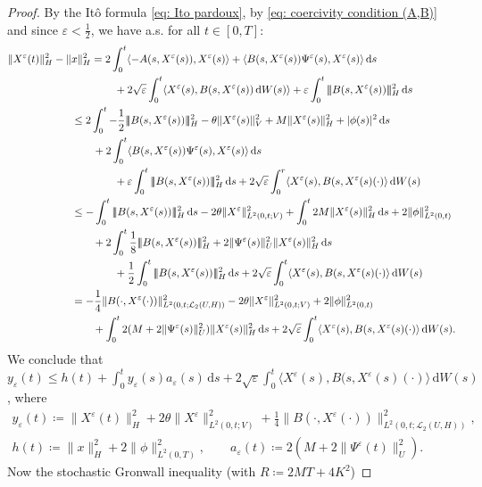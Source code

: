 \documentclass{amsart}
\newcommand{\dd}{\,\mathrm{d}}
\newcommand{\UH}{\mathcal{L}_2(U,H)}
\newcommand{\<}{\langle}
\newcommand{\?}{\rangle}
\newcommand{\nn}{|\!|\!|}
\theoremstyle{plain}
\theoremstyle{remark}
\theoremstyle{plain}
\numberwithin{equation}{section}
\newcommand{\eps}{\varepsilon}
\begin{document}
\begin{proof}
By the It\^o formula \eqref{eq: Ito pardoux},
 by \eqref{eq: coercivity condition (A,B)} and since $\eps<\frac{1}{2}$, we have a.s. \!for all $t\in[0,T]$:
  \begin{align}
    \|X^\eps(t)\|_H^2-\|&x\|_H^2=2\int_0^t\<-A(s,X^\eps(s)),X^\eps(s)\?+\<B(s,X^\eps(s))\Psi^\eps(s),X^\eps(s)\?\dd s\notag\\
    &\qquad\qquad+2\sqrt{\eps}\int_0^t \<X^\eps(s),B(s,X^\eps(s))\dd W(s)\?+\eps\int_0^t \nn B(s,X^\eps(s))\nn_H^2\dd s\notag\\
    &\leq 2\int_0^t-\frac{1}{2}\nn B(s,X^\eps(s))\nn_H^2-\theta\|X^\eps(s)\|_V^2+M\|X^\eps(s)\|_H^2+|\phi(s)|^2\dd s \notag\\
    &\qquad +2\int_0^t\<B(s,X^\eps(s))\Psi^\eps(s),X^\eps(s)\?\dd s\notag\\
    &\qquad\qquad +\eps\int_0^t \nn B(s,X^\eps(s))\nn_H^2\dd s+2\sqrt{\eps}\int_0^r \<X^\eps(s),B(s,X^\eps(s)(\cdot)\?\dd W(s)\notag\\
    &\leq -\int_0^t \nn B(s,X^\eps(s))\nn_H^2\dd s-2\theta\|X^\eps\|_{L^2(0,t;V)}^2+\int_0^t 2M\|X^\eps(s)\|_H^2\dd s+2\|\phi\|_{L^2(0,t)}^2\notag\\
    &\qquad+2\int_0^t \frac{1}{8}\nn B(s,X^\eps(s))\nn_H^2+2\|\Psi^\eps(s)\|_U^2\|X^\eps(s)\|_H^2\dd s\notag\\
    &\qquad\qquad+\frac{1}{2}\int_0^t \nn B(s,X^\eps(s))\nn_H^2\dd s+2\sqrt{\eps}\int_0^t \<X^\eps(s),B(s,X^\eps(s)(\cdot)\?\dd W(s)\notag\\
    &= -\frac{1}{4}\|B(\cdot,X^\eps(\cdot))\|_{L^2(0,t;\UH)}^2
    -2\theta\|X^\eps\|_{L^2(0,t;V)}^2+2\|\phi\|_{L^2(0,t)}^2\notag\\
    &\qquad+\int_0^t 2(M+2\|\Psi^\eps(s)\|_U^2)\|X^\eps(s)\|_H^2\dd s +2\sqrt{\eps}\int_0^t \<X^\eps(s),B(s,X^\eps(s)(\cdot)\?\dd W(s). \label{eq:prep gronwall X^eps}
  \end{align}
We conclude that $
y_\eps(t)\leq h(t)+\int_0^ty_\eps(s)a_\eps(s)\dd s+2\sqrt{\eps}\int_0^t \<X^\eps(s),B(s,X^\eps(s)(\cdot)\?\dd W(s)$, where
\begin{align*}
y_\eps(t)\coloneqq\|X^\eps(t)\|_H^2+2\theta\|X^\eps\|_{L^2(0,t;V)}^2+\frac{1}{4}\| B(\cdot,X^\eps(\cdot))\|_{L^2(0,t;\UH)}^2, \\
h(t)\coloneqq \|x\|_H^2+2\|\phi\|_{L^2(0,T)}^2, \qquad a_\eps(t)\coloneqq  2(M+2\|\Psi^\eps(t)\|_U^2).                                                    
\end{align*}
Now  the stochastic Gronwall inequality \cite[Cor. 5.4b), (50)]{geiss24} (with $R\coloneqq2MT+4K^2$) 

\end{proof}
\end{document}
